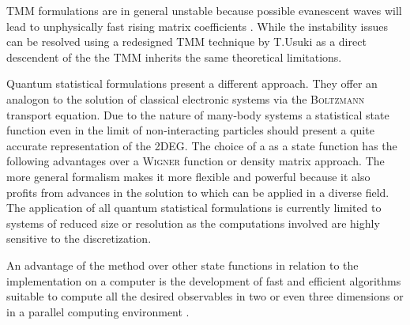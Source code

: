 TMM formulations are in general unstable because possible evanescent waves will lead to unphysically fast rising matrix coefficients \cite{PhysRevB.38.9945}.
While the instability issues can be resolved using a redesigned TMM technique by T.Usuki \cite{PhysRevB.50.7615}\cite{PhysRevB.52.8244} as a direct descendent of the \sdg{} the TMM inherits the same theoretical limitations.\par
Quantum statistical formulations present a different approach. They offer an analogon to the solution of classical electronic systems via the \textsc{Boltzmann} transport equation.
Due to the nature of many-body systems a statistical state function even in the limit of non-interacting particles should present a quite accurate representation of the 2DEG. The choice of a \gfnc{} as a state function has the following advantages over a \textsc{Wigner} function or density matrix approach.
The more general formalism makes it more flexible and powerful because it also profits from advances in the solution to \gfnc{} which can be applied in a diverse field.  The application of all quantum statistical formulations is currently limited to systems of reduced size or resolution as the computations involved are highly sensitive to the discretization.\par
An advantage of the \gfnc{} method over other state functions in relation to the implementation on a computer is the development of fast and efficient algorithms suitable to compute all the desired observables \cite{JApplPhys.91.2343} in two or even three dimensions or in a parallel computing environment \cite{Drouvelis2006parallel}.
